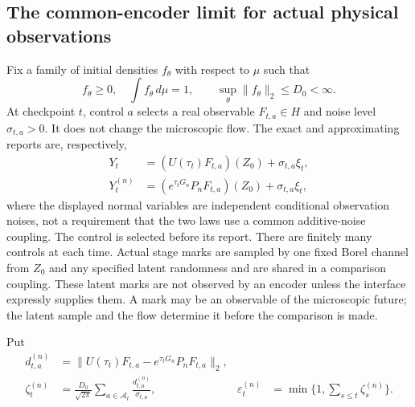 \subsection{The common-encoder limit for actual physical observations}
Fix a family of initial densities $f_\theta$ with respect to $\mu$ such
that
\begin{equation}
 f_\theta\ge0,\quad\int f_\theta\,d\mu=1,
 \qquad \sup_\theta\|f_\theta\|_2\le D_0<\infty.
 \label{eq:v12-preparation}
\end{equation}
At checkpoint $t$, control $a$ selects a real observable $F_{t,a}\in H$
and noise level $\sigma_{t,a}>0$. It does not change the microscopic
flow. The exact and approximating reports are, respectively,
\begin{align}
 Y_t&=(U(\tau_t)F_{t,a})(Z_0)+\sigma_{t,a}\xi_t,\nonumber\\
 Y_t^{(n)}&=(e^{\tau_tG_n}P_nF_{t,a})(Z_0)+\sigma_{t,a}\xi_t,
 \label{eq:v12-observations}
\end{align}
where the displayed normal variables are independent conditional
observation noises, not a requirement that the two laws use a common
additive-noise coupling. The control is selected before its report.
There are finitely many controls at each time. Actual stage marks are
sampled by one fixed Borel channel from $Z_0$ and any specified latent
randomness and are shared in a comparison coupling. These latent marks
are not observed by an encoder unless the interface expressly supplies
them. A mark may be an observable of the microscopic future; the latent
sample and the flow determine it before the comparison is made.

Put
\begin{align}
 d_{t,a}^{(n)}&=\|U(\tau_t)F_{t,a}
                    -e^{\tau_tG_n}P_nF_{t,a}\|_2,\nonumber\\
 \zeta_t^{(n)}&=\frac{D_0}{\sqrt{2\pi}}
                   \sum_{a\in\mathcal A_t}\frac{d_{t,a}^{(n)}}{\sigma_{t,a}},
 &\varepsilon_t^{(n)}&=\min\{1,\textstyle\sum_{s\le t}\zeta_s^{(n)}\}.
 \label{eq:v12-zeta}
\end{align}

